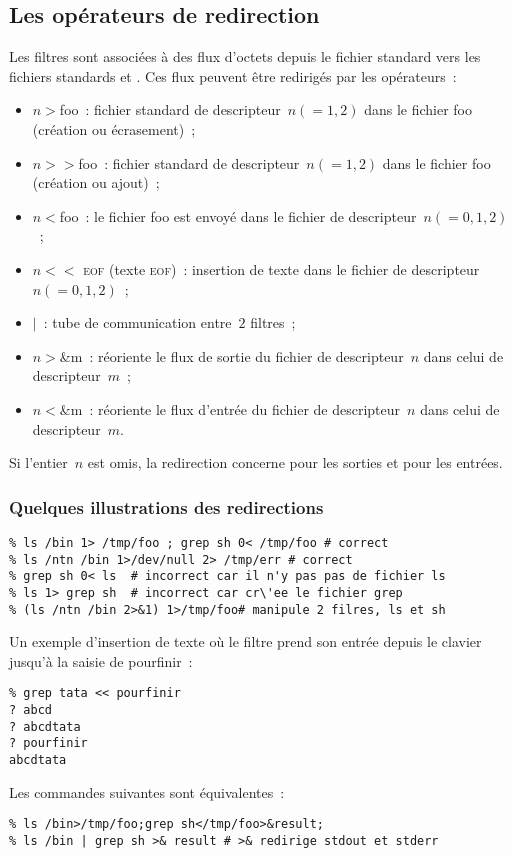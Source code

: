 \subsection{Les op\'erateurs de redirection}%
\begin{frame}
  Les filtres sont associ\'ees \`a des flux d'octets depuis le fichier
  standard \stdin{} vers les fichiers standards \stdout{} et
  \stderr{}.  Ces flux peuvent \^etre redirig\'es par les
  op\'erateurs~:
  \begin{itemize}
  \item[]$n>$foo~: fichier standard de descripteur~$n(=1,2)$ dans le
    fichier foo (cr\'eation ou \'ecrasement)~;
  \item[]$n>>$foo~: fichier standard de descripteur~$n(=1,2)$ dans le
    fichier foo (cr\'eation ou ajout)~;
  \item[]$n<$foo~: le fichier foo est envoy\'e dans le fichier de
    descripteur~$n(=0,1,2)$~;
  \item[]$n<<$ \textsc{eof} (texte \textsc{eof})~: insertion de texte
    dans le fichier de descripteur~$n(=0,1,2)$~;
  \item[]$|$~: tube de communication entre~$2$ filtres~;
  \item[]$n>$\&m~: r\'eoriente le flux de sortie du fichier de
    descripteur~$n$ dans celui de descripteur~$m$~;
  \item[]$n<$\&m~: r\'eoriente le flux d'entr\'ee du fichier de
    descripteur~$n$ dans celui de descripteur~$m$.
  \end{itemize}
  Si l'entier~$n$ est omis, la redirection concerne \stdout{} pour les
  sorties et \stdin{} pour les entr\'ees.
\end{frame}
\begin{frame}[fragile]
  \frametitle{Quelques illustrations des redirections}%
\begin{verbatim}
% ls /bin 1> /tmp/foo ; grep sh 0< /tmp/foo # correct
% ls /ntn /bin 1>/dev/null 2> /tmp/err # correct
% grep sh 0< ls  # incorrect car il n'y pas pas de fichier ls
% ls 1> grep sh  # incorrect car cr\'ee le fichier grep
% (ls /ntn /bin 2>&1) 1>/tmp/foo# manipule 2 filres, ls et sh
\end{verbatim}
  Un exemple d'insertion de texte o\`u le filtre  prend
  son entr\'ee depuis le clavier jusqu'\`a la saisie de pourfinir~:
\begin{verbatim}
% grep tata << pourfinir
? abcd
? abcdtata
? pourfinir
abcdtata
\end{verbatim}
  Les commandes suivantes sont \'equivalentes~:
\begin{verbatim}
% ls /bin>/tmp/foo;grep sh</tmp/foo>&result;
% ls /bin | grep sh >& result # >& redirige stdout et stderr
\end{verbatim}
\end{frame}
